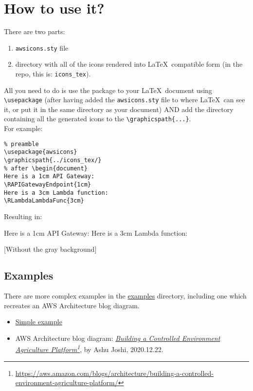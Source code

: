 \documentclass[12pt]{article}
\begin{document}
\section{How to use it?}
There are two parts:
\begin{enumerate}
\item \texttt{awsicons.sty} file
\item directory with all of the icons rendered into \LaTeX\ compatible form (in the repo, this is: \texttt{icons\_tex}).
\end{enumerate}
All you need to do is use the package to your \LaTeX\ document using \texttt{{\textbackslash}usepackage} (after having added the \texttt{awsicons.sty} file to where \LaTeX\ can see it, or put it in the same directory as your document) AND add the directory containing all the generated icons to the \texttt{{\textbackslash}graphicspath\{...\}}.\\

\noindent For example:
\vspace{4mm}

\begin{blockquote}
\begin{verbatim}
% preamble
\usepackage{awsicons} 
\graphicspath{../icons_tex/}
% after \begin{document}
Here is a 1cm API Gateway:
\RAPIGatewayEndpoint{1cm}
Here is a 3cm Lambda function:
\RLambdaLambdaFunc{3cm}

\end{verbatim}
\end{blockquote}

\noindent Resulting in:\\
\begin{blockquote}
Here is a 1cm API Gateway:
Here is a 3cm Lambda function:

\end{blockquote}

[Without the gray background]
    
\subsection{Examples}
There are more complex examples in the \href{https://github.com/gnewton/awsArchIcons2LaTeX/tree/main/examples}{examples} directory, including one which recreates an AWS Architecture blog diagram.

\begin{itemize}
\item \href{https://github.com/gnewton/awsArchIcons2LaTeX/blob/main/examples/simple.pdf}{Simple example}
\item AWS Architecture blog diagram: \textit{\href{https://github.com/gnewton/awsArchIcons2LaTeX/blob/main/examples/Data-pipeline-Grov-Technologies.pdf}{Building a Controlled Environment Agriculture Platform}\footnote{\url{https://aws.amazon.com/blogs/architecture/building-a-controlled-environment-agriculture-platform/}}}, by Ashu Joshi, 2020.12.22.
\end{itemize}
  
\end{document}

